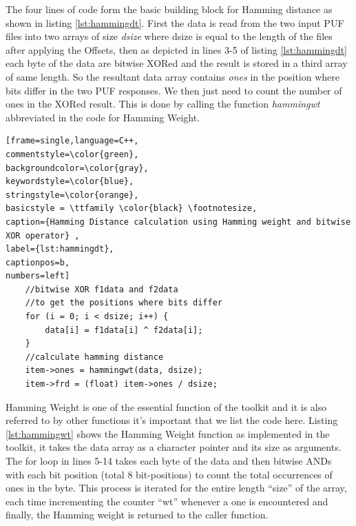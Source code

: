 The four lines of code form the basic building block for Hamming distance as shown in listing \ref{lst:hammingdt}. First the data is read from the two input PUF files into two arrays of size \emph{dsize} where dsize is equal to the length of the files after applying the Offsets, then as depicted in lines 3-5 of listing \ref{lst:hammingdt} each byte of the data are bitwise XORed and the result is stored in a third array of same length. So the resultant data array contains
\emph{ones} in the position where bits differ in the two PUF responses. We then just need to count the number of ones in the XORed result.
This is done by calling the function \emph{hammingwt} abbreviated in the code for Hamming Weight.\\

\begin{center}
\begin{minipage}{0.7\textwidth}
\begin{lstlisting}[frame=single,language=C++,
commentstyle=\color{green},
backgroundcolor=\color{gray},
keywordstyle=\color{blue},
stringstyle=\color{orange},
basicstyle = \ttfamily \color{black} \footnotesize,
caption={Hamming Distance calculation using Hamming weight and bitwise XOR operator} ,
label={lst:hammingdt},
captionpos=b,
numbers=left]
    //bitwise XOR f1data and f2data
    //to get the positions where bits differ
    for (i = 0; i < dsize; i++) {
        data[i] = f1data[i] ^ f2data[i];
    }
    //calculate hamming distance
    item->ones = hammingwt(data, dsize);
    item->frd = (float) item->ones / dsize;
\end{lstlisting}
\end{minipage}
\end{center}

Hamming Weight is one of the essential function of the toolkit and it is also referred to by other functions it's important that we list the code here. Listing \ref{lst:hammingwt} shows the Hamming Weight function as implemented in the toolkit, it takes the data array as a character pointer and its size as arguments. The for loop in lines 5-14 takes each byte of the data and then bitwise ANDs with each bit position (total 8 bit-positions) to count the total occurrences of ones in the byte. This process is
iterated for the entire length ``size'' of the array, each time incrementing the counter ``wt'' whenever a one is encountered and finally, the Hamming weight is returned to the caller function.\\


